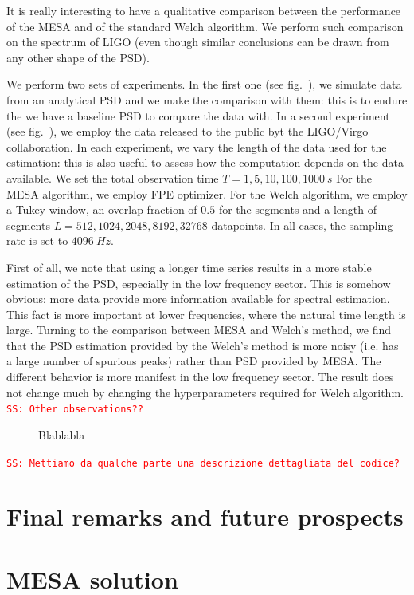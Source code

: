\documentclass[twocolumn,showpacs,preprintnumbers,nofootinbib,prd,
superscriptaddress,10pt]{revtex4-1}
\newcommand{\sschmidt}[1]{{\textcolor{red}{\texttt{SS: #1}} }}
\begin{document}
It is really interesting to have a qualitative comparison between the performance of the MESA and of the standard Welch algorithm.
We perform such comparison on the spectrum of LIGO (even though similar conclusions can be drawn from any other shape of the PSD).

We perform two sets of experiments.
In the first one (see fig.~), we simulate data from an analytical PSD and we make the comparison with them: this is to endure the we have a baseline PSD to compare the data with.
In a second experiment (see fig.~), we employ the data released to the public byt the LIGO/Virgo collaboration.
In each experiment, we vary the length of the data used for the estimation: this is also useful to assess how the computation depends on the data available. We set the total observation time $T = 1, 5, 10, 100, 1000 \SI{}{s}$
For the MESA algorithm, we employ FPE optimizer. For the Welch algorithm, we employ a Tukey window, an overlap fraction of $0.5$ for the segments and a length of segments $L = 512, 1024, 2048, 8192, 32768$ datapoints.
In all cases, the sampling rate is set to $\SI{4096}{Hz}$.

First of all, we note that using a longer time series results in a more stable estimation of the PSD, especially in the low frequency sector. This is somehow obvious: more data provide more information available for spectral estimation. This fact is more important at lower frequencies, where the natural time length is large.
Turning to the comparison between MESA and Welch's method, we find that the PSD estimation provided by the Welch's method is more noisy (i.e. has a large number of spurious peaks) rather than PSD provided by MESA. The different behavior is more manifest in the low frequency sector.
The result does not change much by changing the hyperparameters required for Welch algorithm.
\sschmidt{Other observations??}


\begin{figure}
	\label{fig:mem_welch_realdata}
	\caption{Blablabla}
\end{figure}

\sschmidt{Mettiamo da qualche parte una descrizione dettagliata del codice?}

\section{Final remarks and future prospects}

\appendix
\section{MESA solution} \label{sec:MESA_solution}
\end{document}
